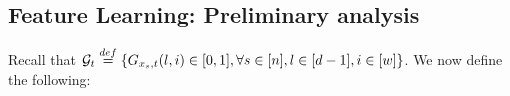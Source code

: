 \subsection{Feature Learning: Preliminary analysis }

Recall that $\mathcal{G}_t\stackrel{def}=\{G_{x_{s},t}(l,i) \in [0,1], \forall s\in[n],l\in[d-1],i\in[w]\}$. We now define the following:

